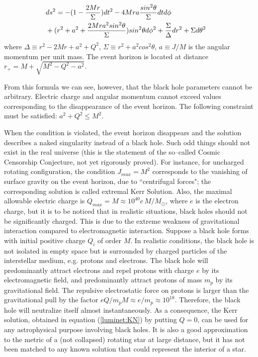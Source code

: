 \documentclass[12pt]{article}
\begin{document}
\begin{eqnarray}
        \lefteqn{ds^2  = - (1- \frac{2Mr}{\Sigma})dt^2 
        - 4Mra \frac{sin^2\theta}{\Sigma}dtd\phi}\nonumber\\
 & + (r^2 + a^2 + \frac{2Mr a^2 sin^2\theta}{\Sigma})sin^2\theta d\phi^2 + \frac{
\Sigma}{\Delta}dr^2 + \Sigma d\theta^2  \label{luminet:KN}
\end{eqnarray}
where
$\Delta \equiv r^2 - 2 Mr + a^2 + Q^2$, $ \Sigma \equiv r^2 + a^2 cos^2\theta$, 
$a \equiv J/M$ is the angular momentum per unit mass.
The event horizon is located at distance $r_+ = M + \sqrt{M^2 - Q^2 - a^2}$.
 
From this formula we can see, however, that the black hole parameters cannot
be arbitrary.
Electric charge and angular momentum cannot exceed values corresponding to
the disappearance of the event horizon.
The following constraint must be satisfied: $ a^2 + Q^2 \le M^2.$

When the condition is violated, the event horizon disappears and
the solution describes a naked singularity instead of a black hole. Such odd
things should not exist in the real universe (this is the statement of the so--called
Cosmic Censorship Conjecture, not yet rigorously proved). For instance, for uncharged rotating
configuration, the condition $J_{max} = M^2$ corresponds to the vanishing of surface gravity
on the event horizon, due to ``centrifugal forces"; the corresponding solution is called extremal Kerr Solution.
Also, the maximal allowable electric charge is 
$Q_{max} = M \approx 10^{40} e \, M/M_{\odot}$, where $e$ is the electron charge, but it is to be noticed that
in realistic situations, black holes should not be significantly charged. This is due to the
extreme weakness of gravitational interaction compared to electromagnetic interaction.
Suppose  a black hole forms with initial positive charge $Q_i$ of order $M$. In realistic
conditions, the black hole is not isolated in empty space but is surrounded by charged
particles of the interstellar medium, e.g. protons and electrons. The black hole will
predominantly  attract electrons and repel protons with charge $e$ by its electromagnetic
field, and predominantly attract protons of mass $m_p$ by its gravitational field.
The repulsive electrostatic force on protons is larger than the
gravitational pull by the factor
$eQ/m_pM \approx e/m_p \approx 10^{18}$.
Therefore, the black hole will neutralize itself almost instantaneously. As
a consequence, the Kerr solution, obtained in equation (\ref{luminet:KN}) by putting $Q=0$, can be
used for any astrophysical purpose involving black holes. It is also a good approximation to
the metric of a (not collapsed) rotating star at large distance, but it has not been matched
to any known solution that could represent the interior of a star.
\end{document}
